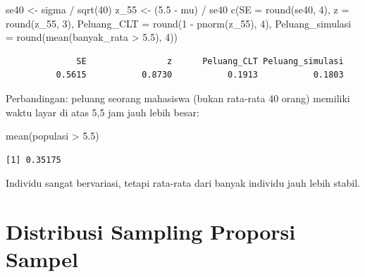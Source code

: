 \documentclass[
  indonesian,
  letterpaper,
]{book}
\newenvironment{Shaded}{\begin{snugshade}}{\end{snugshade}}
\newcommand{\AttributeTok}[1]{\textcolor[rgb]{0.40,0.45,0.13}{#1}}
\newcommand{\DecValTok}[1]{\textcolor[rgb]{0.68,0.00,0.00}{#1}}
\newcommand{\FloatTok}[1]{\textcolor[rgb]{0.68,0.00,0.00}{#1}}
\newcommand{\FunctionTok}[1]{\textcolor[rgb]{0.28,0.35,0.67}{#1}}
\newcommand{\NormalTok}[1]{\textcolor[rgb]{0.00,0.23,0.31}{#1}}
\newcommand{\OtherTok}[1]{\textcolor[rgb]{0.00,0.23,0.31}{#1}}
\newcommand{\SpecialCharTok}[1]{\textcolor[rgb]{0.37,0.37,0.37}{#1}}
\begin{document}
\begin{Shaded}
\begin{Highlighting}[]
\NormalTok{se40 }\OtherTok{\textless{}{-}}\NormalTok{ sigma }\SpecialCharTok{/} \FunctionTok{sqrt}\NormalTok{(}\DecValTok{40}\NormalTok{)}
\NormalTok{z\_55 }\OtherTok{\textless{}{-}}\NormalTok{ (}\FloatTok{5.5} \SpecialCharTok{{-}}\NormalTok{ mu) }\SpecialCharTok{/}\NormalTok{ se40}
\FunctionTok{c}\NormalTok{(}\AttributeTok{SE =} \FunctionTok{round}\NormalTok{(se40, }\DecValTok{4}\NormalTok{), }\AttributeTok{z =} \FunctionTok{round}\NormalTok{(z\_55, }\DecValTok{3}\NormalTok{),}
\AttributeTok{Peluang\_CLT =} \FunctionTok{round}\NormalTok{(}\DecValTok{1} \SpecialCharTok{{-}} \FunctionTok{pnorm}\NormalTok{(z\_55), }\DecValTok{4}\NormalTok{),}
\AttributeTok{Peluang\_simulasi =} \FunctionTok{round}\NormalTok{(}\FunctionTok{mean}\NormalTok{(banyak\_rata }\SpecialCharTok{\textgreater{}} \FloatTok{5.5}\NormalTok{), }\DecValTok{4}\NormalTok{))}
\end{Highlighting}
\end{Shaded}

\begin{verbatim}
              SE                z      Peluang_CLT Peluang_simulasi 
          0.5615           0.8730           0.1913           0.1803 
\end{verbatim}

Perbandingan: peluang seorang mahasiswa (bukan rata-rata 40 orang)
memiliki waktu layar di atas 5,5 jam jauh lebih besar:

\begin{Shaded}
\begin{Highlighting}[]
\FunctionTok{mean}\NormalTok{(populasi }\SpecialCharTok{\textgreater{}} \FloatTok{5.5}\NormalTok{)}
\end{Highlighting}
\end{Shaded}

\begin{verbatim}
[1] 0.35175
\end{verbatim}

Individu sangat bervariasi, tetapi rata-rata dari banyak individu jauh
lebih stabil.

\section{Distribusi Sampling Proporsi
Sampel}\label{distribusi-sampling-proporsi-sampel}
\end{document}
